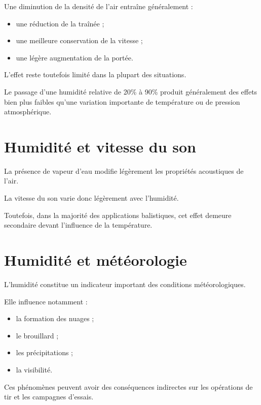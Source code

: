 Une diminution de la densité de l'air entraîne généralement :

\begin{itemize}
\item une réduction de la traînée ;
\item une meilleure conservation de la vitesse ;
\item une légère augmentation de la portée.
\end{itemize}

L'effet reste toutefois limité dans la plupart des situations.

\begin{exemple}

Le passage d'une humidité relative de 20\% à 90\% produit généralement
des effets bien plus faibles qu'une variation importante de température ou de
pression atmosphérique.

\end{exemple}

\section{Humidité et vitesse du son}

La présence de vapeur d'eau modifie légèrement les propriétés acoustiques de
l'air.

La vitesse du son varie donc légèrement avec l'humidité.

Toutefois, dans la majorité des applications balistiques, cet effet demeure
secondaire devant l'influence de la température.

\section{Humidité et météorologie}

L'humidité constitue un indicateur important des conditions
météorologiques.

Elle influence notamment :

\begin{itemize}
\item la formation des nuages ;
\item le brouillard ;
\item les précipitations ;
\item la visibilité.
\end{itemize}

Ces phénomènes peuvent avoir des conséquences indirectes sur les opérations
de tir et les campagnes d'essais.

